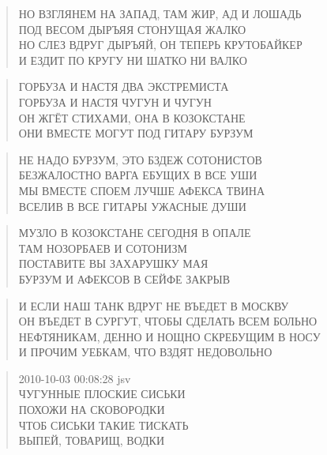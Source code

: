 \poemtitle{***}
\begin{verse}
НО ВЗГЛЯНЕМ НА ЗАПАД, ТАМ ЖИР, АД И ЛОШАДЬ\\
ПОД ВЕСОМ ДЫРЪЯЯ СТОНУЩАЯ ЖАЛКО\\
НО СЛЕЗ ВДРУГ ДЫРЪЯЙ, ОН ТЕПЕРЬ КРУТОБАЙКЕР\\
И ЕЗДИТ ПО КРУГУ НИ ШАТКО НИ ВАЛКО
\end{verse}

\poemtitle{***}
\begin{verse}
ГОРБУЗА И НАСТЯ ДВА ЭКСТРЕМИСТА\\
ГОРБУЗА И НАСТЯ ЧУГУН И ЧУГУН\\
ОН ЖГЁТ СТИХАМИ, ОНА В КОЗОКСТАНЕ\\
ОНИ ВМЕСТЕ МОГУТ ПОД ГИТАРУ БУРЗУМ
\end{verse}

\poemtitle{***}
\begin{verse}
НЕ НАДО БУРЗУМ, ЭТО БЗДЕЖ СОТОНИСТОВ\\
БЕЗЖАЛОСТНО ВАРГА ЕБУЩИХ В ВСЕ УШИ\\
МЫ ВМЕСТЕ СПОЕМ ЛУЧШЕ АФЕКСА ТВИНА\\
ВСЕЛИВ В ВСЕ ГИТАРЫ УЖАСНЫЕ ДУШИ
\end{verse}

\poemtitle{***}
\begin{verse}
МУЗЛО В КОЗОКСТАНЕ СЕГОДНЯ В ОПАЛЕ\\
ТАМ НОЗОРБАЕВ И СОТОНИЗМ\\
ПОСТАВИТЕ ВЫ ЗАХАРУШКУ МАЯ\\
БУРЗУМ И АФЕКСОВ В СЕЙФЕ ЗАКРЫВ
\end{verse}

\poemtitle{***}
\begin{verse}
И ЕСЛИ НАШ ТАНК ВДРУГ НЕ ВЪЕДЕТ В МОСКВУ\\
ОН ВЪЕДЕТ В СУРГУТ, ЧТОБЫ СДЕЛАТЬ ВСЕМ БОЛЬНО\\
НЕФТЯНИКАМ, ДЕННО И НОЩНО СКРЕБУЩИМ В НОСУ\\
И ПРОЧИМ УЕБКАМ, ЧТО ВЗДЯТ НЕДОВОЛЬНО
\end{verse}

\poemtitle{***}
\begin{verse}
2010-10-03 00:08:28 jsv\\
ЧУГУННЫЕ ПЛОСКИЕ СИСЬКИ\\
ПОХОЖИ НА СКОВОРОДКИ\\
ЧТОБ СИСЬКИ ТАКИЕ ТИСКАТЬ\\
ВЫПЕЙ, ТОВАРИЩ, ВОДКИ
\end{verse}

